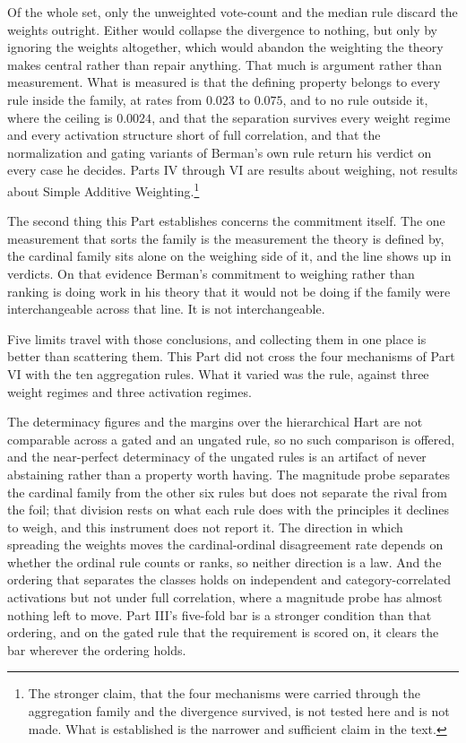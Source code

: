 Of the whole set, only the unweighted vote-count and the median rule
discard the weights outright. Either would collapse the divergence to
nothing, but only by ignoring the weights altogether, which would abandon
the weighting the theory makes central rather than repair anything. That much is argument rather than measurement.
What is measured is that the defining property belongs to every rule inside
the family, at rates from $0.023$ to $0.075$, and to no rule outside it,
where the ceiling is $0.0024$, and that the separation survives every
weight regime and every activation structure short of full correlation, and that the normalization and
gating variants of Berman's own rule return his verdict on every case he
decides. Parts IV through VI are results about weighing, not results
about Simple Additive Weighting.\footnote{The stronger claim, that the
four mechanisms were carried through the aggregation family and the
divergence survived, is not tested here and is not made. What is
established is the narrower and sufficient claim in the text.}

The second thing this Part establishes concerns the commitment itself. The
one measurement that sorts the family is the measurement the theory is
defined by, the cardinal family sits alone on the weighing side of it, and
the line shows up in verdicts. On that evidence Berman's commitment to
weighing rather than ranking is doing work in his theory that it would not
be doing if the family were interchangeable across that line. It is not interchangeable.

Five limits travel with those conclusions, and collecting them in one place
is better than scattering them. This Part did not cross the four mechanisms
of Part VI with the ten aggregation rules. What it varied was the rule,
against three weight regimes and three activation regimes.

The determinacy figures and the margins over the hierarchical Hart are
not comparable across a gated and an ungated rule, so no such comparison
is offered, and the near-perfect determinacy of the ungated rules is an
artifact of never abstaining rather than a property worth having. The
magnitude probe separates the cardinal family from the other six rules
but does not separate the rival from the foil; that division rests on
what each rule does with the principles it declines to weigh, and this
instrument does not report it. The direction in which spreading the weights moves the cardinal-ordinal
disagreement rate depends on whether the ordinal rule counts or ranks, so
neither direction is a law. And the ordering that separates the classes holds
on independent and category-correlated activations but not under full
correlation, where a magnitude probe has almost nothing left to move. Part
III's five-fold bar is a stronger condition than that ordering, and on the
gated rule that the requirement is scored on, it clears the bar wherever the
ordering holds.

